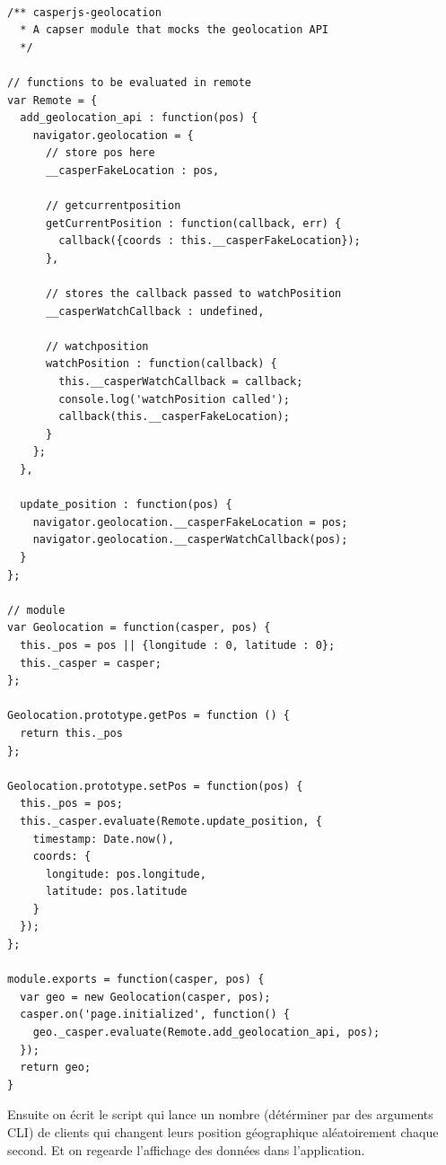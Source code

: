 \documentclass[a4paper]{article}
\begin{document}
\begin{lstlisting}

/** casperjs-geolocation
  * A capser module that mocks the geolocation API
  */

// functions to be evaluated in remote
var Remote = {
  add_geolocation_api : function(pos) {
    navigator.geolocation = {
      // store pos here
      __casperFakeLocation : pos,
      
      // getcurrentposition
      getCurrentPosition : function(callback, err) {
        callback({coords : this.__casperFakeLocation});
      },

      // stores the callback passed to watchPosition
      __casperWatchCallback : undefined,

      // watchposition
      watchPosition : function(callback) {
        this.__casperWatchCallback = callback;
        console.log('watchPosition called');
        callback(this.__casperFakeLocation);
      }
    };
  },

  update_position : function(pos) {
    navigator.geolocation.__casperFakeLocation = pos;
    navigator.geolocation.__casperWatchCallback(pos);
  }
};

// module
var Geolocation = function(casper, pos) {
  this._pos = pos || {longitude : 0, latitude : 0};
  this._casper = casper;
};

Geolocation.prototype.getPos = function () {
  return this._pos
};

Geolocation.prototype.setPos = function(pos) {
  this._pos = pos;
  this._casper.evaluate(Remote.update_position, {
    timestamp: Date.now(),
    coords: {
      longitude: pos.longitude,
      latitude: pos.latitude
    }
  });
};

module.exports = function(casper, pos) {
  var geo = new Geolocation(casper, pos);
  casper.on('page.initialized', function() {
    geo._casper.evaluate(Remote.add_geolocation_api, pos);
  });
  return geo;
}
\end{lstlisting}

Ensuite on écrit le script qui lance un nombre (détérminer par des arguments CLI)
de clients qui changent leurs position géographique aléatoirement chaque second.
Et on regearde l'affichage des données dans l'application.
\end{document}
